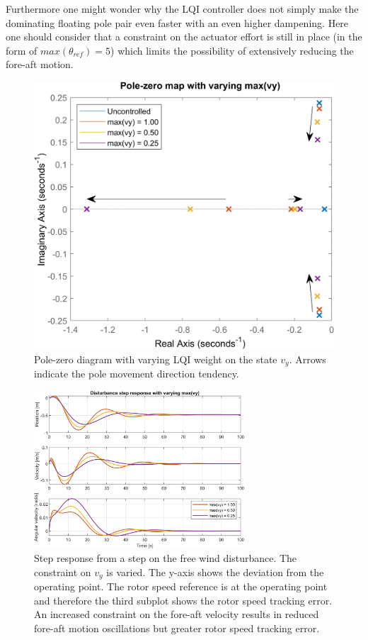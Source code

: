 Furthermore one might wonder why the LQI controller does not simply make the dominating floating pole pair even faster with an even higher dampening. Here one should consider that a constraint on the actuator effort is still in place (in the form of $ max(\theta_{ref}) = 5 $) which limits the possibility of extensively reducing the fore-aft motion.
\begin{figure}[ht]
	\centering
	\includegraphics[width=.55\textwidth]{Graphics/LQI pole zero/02_pzmap_vy}
	\caption{Pole-zero diagram with varying LQI weight on the state $ v_y $. Arrows indicate the pole movement direction tendency.}
	\label{fig:pzmap_vy}
\end{figure}
\begin{figure}[ht]
	\centering
	\includegraphics[width=0.7\textwidth]{Graphics/LQI pole zero/102_step_vy.png}
	\caption{Step response from a step on the free wind disturbance. The constraint on $ v_y $ is varied. The y-axis shows the deviation from the operating point. The rotor speed reference is at the operating point and therefore the third subplot shows the rotor speed tracking error. An increased constraint on the fore-aft velocity results in reduced fore-aft motion oscillations but greater rotor speed tracking error.}
	\label{fig:step_vy}
\end{figure}

